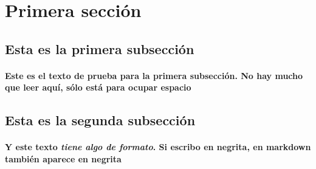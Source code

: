 \usepackage[spanish]{babel}


  \section{Primera sección}
  \subsection{Esta es la primera subsección}
  \paragraph{Este es el texto de prueba para la primera subsección. No hay mucho que leer aquí, sólo está para ocupar espacio}
  \subsection{Esta es la segunda subsección}
  \paragraph{Y este texto \textit{tiene algo de formato}. \textbf{Si escribo en negrita}, en markdown también aparece en negrita}

